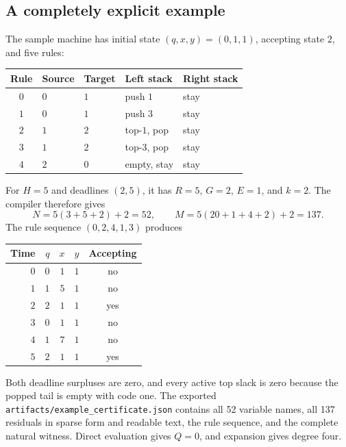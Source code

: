 \documentclass[11pt,letterpaper]{article}
\theoremstyle{definition}
\theoremstyle{remark}
\newcommand{\code}[1]{\texttt{#1}}
\newcommand{\1}{\mathbf 1}
\begin{document}
\subsection{A completely explicit example}
The sample machine has initial state $(q,x,y)=(0,1,1)$, accepting state
$2$, and five rules:
\begin{center}
\begin{tabular}{@{}cllll@{}}
\toprule
Rule & Source & Target & Left stack & Right stack\\
\midrule
$0$ & $0$ & $1$ & push $1$ & stay\\
$1$ & $0$ & $1$ & push $3$ & stay\\
$2$ & $1$ & $2$ & top-$1$, pop & stay\\
$3$ & $1$ & $2$ & top-$3$, pop & stay\\
$4$ & $2$ & $0$ & empty, stay & stay\\
\bottomrule
\end{tabular}
\end{center}
For $H=5$ and deadlines $(2,5)$, it has $R=5$, $G=2$, $E=1$, and $k=2$.
The compiler therefore gives
\[
 N=5(3+5+2)+2=52,\qquad
 M=5(20+1+4+2)+2=137.
\]
The rule sequence $(0,2,4,1,3)$ produces
\begin{center}
\begin{tabular}{@{}rrrrc@{}}
\toprule
Time & $q$ & $x$ & $y$ & Accepting\\
\midrule
$0$ & $0$ & $1$ & $1$ & no\\
$1$ & $1$ & $5$ & $1$ & no\\
$2$ & $2$ & $1$ & $1$ & yes\\
$3$ & $0$ & $1$ & $1$ & no\\
$4$ & $1$ & $7$ & $1$ & no\\
$5$ & $2$ & $1$ & $1$ & yes\\
\bottomrule
\end{tabular}
\end{center}
Both deadline surpluses are zero, and every active top slack is zero
because the popped tail is empty with code one. The exported
\code{artifacts/example\_certificate.json} contains all 52 variable names,
all 137 residuals in sparse form and readable text, the rule sequence,
and the complete natural witness. Direct evaluation gives $Q=0$, and
expansion gives degree four.
\end{document}
